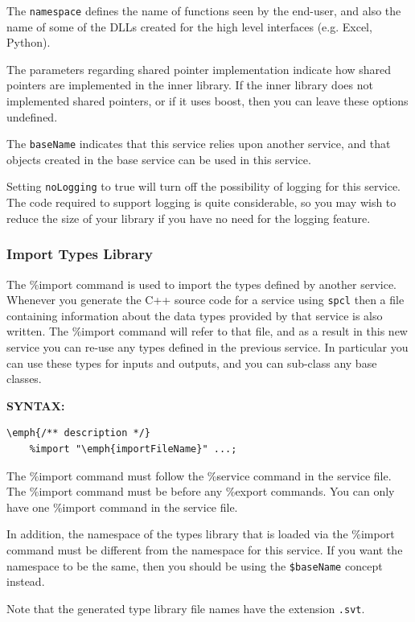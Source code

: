The \texttt{namespace} defines the name of functions seen by the end-user, and also the name of some of the DLLs created for the high level interfaces (e.g. Excel, Python).

The parameters regarding shared pointer implementation indicate how shared pointers are implemented in the inner library.
If the inner library does not implemented shared pointers, or if it uses boost, then you can leave these options undefined.

The \texttt{baseName} indicates that this service relies upon another service, and that objects created in the base service can be used in this service.

Setting \texttt{noLogging} to true will turn off the possibility of logging for this service.
The code required to support logging is quite considerable, so you may wish to reduce the size of your library if you have no need for the logging feature.


\subsubsection{Import Types Library} \label{import}

The \%import command is used to import the types defined by another service.
Whenever you generate the C++ source code for a service using \texttt{spcl} then a file containing information about the data types provided by that service is also written.
The \%import command will refer to that file, and as a result in this new service you can re-use any types defined in the previous service.
In particular you can use these types for inputs and outputs, and you can sub-class any base classes.


\textbf{SYNTAX:}
\nopagebreak
\begin{Verbatim}[commandchars=\\\{\}]
    \emph{/** description */}
    %import "\emph{importFileName}" ...;
\end{Verbatim}
The \%import command must follow the \%service command in the service file.
The \%import command must be before any \%export commands.
You can only have one \%import command in the service file.

In addition, the namespace of the types library that is loaded 
via the \%import command must be different from the namespace 
for this service.
If you want the namespace to be the same, then you should be 
using the \texttt{\$baseName} concept instead.

Note that the generated type library file names have the extension \texttt{.svt}.

